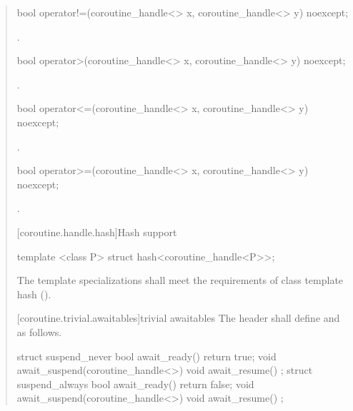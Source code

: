 \begin{quote}
\begin{itemdecl}
  bool operator!=(coroutine_handle<> x, coroutine_handle<> y) noexcept;
\end{itemdecl}

\begin{itemdescr}
  \pnum
  \returns {}.
\end{itemdescr}

\begin{itemdecl}
  bool operator>(coroutine_handle<> x, coroutine_handle<> y) noexcept;
\end{itemdecl}

\begin{itemdescr}
  \pnum
  \returns {}.
\end{itemdescr}

\begin{itemdecl}
  bool operator<=(coroutine_handle<> x, coroutine_handle<> y) noexcept;
\end{itemdecl}

\begin{itemdescr}
  \pnum
  \returns {}.
\end{itemdescr}

\begin{itemdecl}
  bool operator>=(coroutine_handle<> x, coroutine_handle<> y) noexcept;
\end{itemdecl}

\begin{itemdescr}
  \pnum
  \returns {}.
\end{itemdescr}

[coroutine.handle.hash]{Hash support}

\begin{itemdecl}
  template <class P> struct hash<coroutine_handle<P>>;
\end{itemdecl}

\begin{itemdescr}
  \pnum
The template specializations shall meet the requirements of class template hash ().
\end{itemdescr}

[coroutine.trivial.awaitables]{trivial awaitables}
The header  shall define  and  as follows.
\begin{codeblock}
  struct suspend_never {
    bool await_ready() { return true; }
    void await_suspend(coroutine_handle<>){}
    void await_resume() {}
  };
  struct suspend_always {
    bool await_ready() { return false; }
    void await_suspend(coroutine_handle<>){}
    void await_resume() {}
  };
\end{codeblock}


\end{quote}
